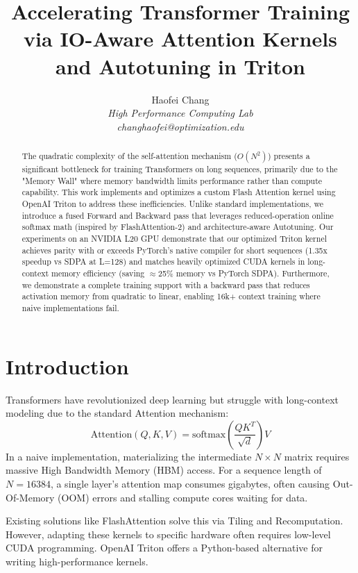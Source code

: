 \documentclass[10pt,conference,letterpaper]{IEEEtran}
\title{Accelerating Transformer Training via IO-Aware Attention Kernels and Autotuning in Triton}
\author{%
{Haofei Chang}%
\vspace{1.6mm}\\
\fontsize{10}{10}\selectfont\itshape
High Performance Computing Lab\\
\fontsize{9}{9}\selectfont\ttfamily\upshape
changhaofei@optimization.edu
}
\begin{document}
\maketitle

\begin{abstract} 
The quadratic complexity of the self-attention mechanism ($O(N^2)$) presents a significant bottleneck for training Transformers on long sequences, primarily due to the "Memory Wall" where memory bandwidth limits performance rather than compute capability. This work implements and optimizes a custom Flash Attention kernel using OpenAI Triton to address these inefficiencies. Unlike standard implementations, we introduce a fused Forward and Backward pass that leverages reduced-operation online softmax math (inspired by FlashAttention-2) and architecture-aware Autotuning. Our experiments on an NVIDIA L20 GPU demonstrate that our optimized Triton kernel achieves parity with or exceeds PyTorch's native compiler for short sequences (1.35x speedup vs SDPA at L=128) and matches heavily optimized CUDA kernels in long-context memory efficiency (saving $\approx$25\% memory vs PyTorch SDPA). Furthermore, we demonstrate a complete training support with a backward pass that reduces activation memory from quadratic to linear, enabling 16k+ context training where naive implementations fail.
\end{abstract}

\section{Introduction}
Transformers have revolutionized deep learning but struggle with long-context modeling due to the standard Attention mechanism:
\begin{equation}
\text{Attention}(Q, K, V) = \text{softmax}\left(\frac{QK^T}{\sqrt{d}}\right)V
\end{equation}
In a naive implementation, materializing the intermediate $N \times N$ matrix requires massive High Bandwidth Memory (HBM) access. For a sequence length of $N=16384$, a single layer's attention map consumes gigabytes, often causing Out-Of-Memory (OOM) errors and stalling compute cores waiting for data.

Existing solutions like FlashAttention \cite{dao2022flashattention} solve this via Tiling and Recomputation. However, adapting these kernels to specific hardware often requires low-level CUDA programming. OpenAI Triton offers a Python-based alternative for writing high-performance kernels.
\end{document}
